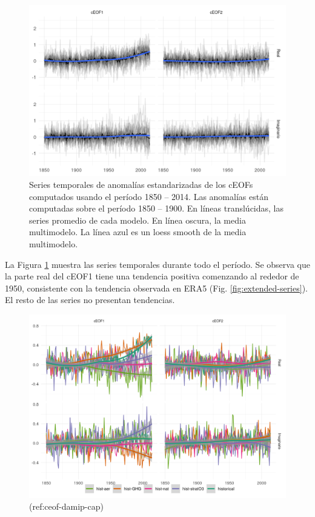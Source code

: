 \documentclass[12pt,oneside]{reedthesis}
\begin{document}
\begin{figure}
\includegraphics{figures/50-cmip6/series-largas-1} \caption{Series temporales de anomalías estandarizadas de los cEOFs computados usando el período 1850 -- 2014.
Las anomalías están computadas sobre el período 1850 -- 1900.
En líneas translúcidas, las series promedio de cada modelo.
En línea oscura, la media multimodelo.
La línea azul es un loess smooth de la media multimodelo.}\label{fig:series-largas}
\end{figure}







La Figura \ref{fig:series-largas} muestra las series temporales durante todo el período.
Se observa que la parte real del cEOF1 tiene una tendencia positiva comenzando al rededor de 1950, consistente con la tendencia observada en ERA5 (Fig. \ref{fig:extended-series}).
El resto de las series no presentan tendencias.

\begin{figure}
\includegraphics{figures/50-cmip6/ceof-damip-1} \caption{(ref:ceof-damip-cap)}\label{fig:ceof-damip}
\end{figure}
\end{document}
